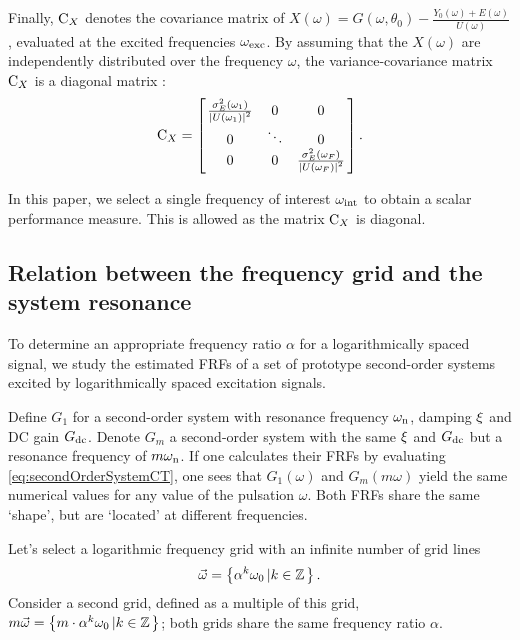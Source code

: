   Finally, $\mathrm{C}_{X}$ denotes the covariance matrix of $X\left(\omega\right) = G\left(\omega, \theta_0 \right) - \frac{Y_0\left(\omega \right) + E\left( \omega \right)  }{ U\left( \omega \right) } $, evaluated at the excited frequencies $\omega_{\mathrm{exc}}$.
  By assuming that the $X\left( \omega \right) $ are independently distributed over the frequency $\omega$, the variance-covariance matrix $\mathrm{C}_{X}$ is a diagonal matrix \citep{Pintelon2001}:
  \begin{equation}
    \mathrm{C}_{X} =
               \left[ \left.
               \begin{matrix}
                 \frac{\sigma^2_E\left(\omega_1 \right) }
                      {\left|  U\left(\omega_1 \right) \right|^2 } & 0 & 0 \\
                 0 & \ddots & 0 \\
                 0 & 0 & \frac{\sigma^2_E\left(\omega_F \right) }
                              {\left| U\left(\omega_F \right) \right|^2 }
               \end{matrix}
               \right.^{\vphantom{x}}\right]
    \text{.}
  \end{equation}

  In this paper, we select a single frequency of interest $\omega_{\mathrm{int}}$
  to obtain a scalar performance measure.
  This is allowed as the matrix $\mathrm{C}_{X}$ is diagonal.

  \subsection{Relation between the frequency grid and the system resonance} \label{sec:relationLogGridSystem}
  To determine an appropriate frequency ratio $\alpha$ for a logarithmically spaced signal, we study the estimated FRFs of a set of prototype second-order systems excited by logarithmically spaced excitation signals.

  Define $G_{1}$ for a second-order system with resonance frequency $\omega_{\mathrm{n}}$, damping $\xi$ and DC gain $G_{\mathrm{dc}}$.
  Denote $G_m$ a second-order system with the same $\xi$ and $G_{\mathrm{dc}}$ but a resonance frequency of $m\omega_{\mathrm{n}}$.
  If one calculates their FRFs by evaluating \eqref{eq:secondOrderSystemCT}, one sees that $G_1(\omega)$ and $G_m(m\omega)$ yield the same numerical values for any value of the pulsation $\omega$.
  Both FRFs share the same `shape', but are `located' at different frequencies.

  Let's select a logarithmic frequency grid with an infinite number of grid lines
  \begin{equation}
    \vec{\omega} = \left\{\alpha^k \omega_0 \left| k \in \mathbb{Z} \right.\right\}
    \label{eq:freqGridLog}
    \text{.}
  \end{equation}
  Consider a second grid, defined as a multiple of this grid, $m\vec{\omega} = \left\{m \cdot \alpha^k \omega_0 \left| k \in \mathbb{Z} \right.\right\}$; both grids share the same frequency ratio $\alpha$.
  

